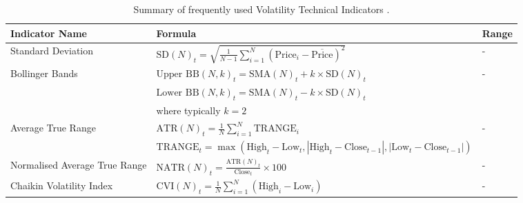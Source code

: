 \begin{table}[htb!]
\caption{Summary of frequently used Volatility Technical Indicators \cite{jansen_machine_2020}.}
\label{Tables:VolatilityIndicators}
\centering
\footnotesize
\begin{tabularx}{\textwidth}{@{}lXl@{}}
\toprule
\textbf{Indicator Name} & \textbf{Formula} & \textbf{Range} \\ 
\midrule
Standard Deviation & $\text{SD}(N)_t = \sqrt{\frac{1}{N-1} \sum_{i=1}^{N} (\text{Price}_i - \overline{\text{Price}})^2}$ & - \\
\addlinespace
Bollinger Bands & $\text{Upper BB}(N, k)_t = \text{SMA}(N)_t + k \times \text{SD}(N)_t$ & - \\
\addlinespace
& $\text{Lower BB}(N, k)_t = \text{SMA}(N)_t - k \times \text{SD}(N)_t$ & \\
\addlinespace
& where typically $ k = 2 $& \\
\addlinespace
Average True Range & $\text{ATR}(N)_t = \frac{1}{N} \sum_{i=1}^{N} \text{TRANGE}_i$ & - \\
\addlinespace
& $\text{TRANGE}_t = \max(\text{High}_t - \text{Low}_t, |\text{High}_t - \text{Close}_{t-1}|, |\text{Low}_t - \text{Close}_{t-1}|)$ & \\
\addlinespace
Normalised Average True Range & $\text{NATR}(N)_t = \frac{\text{ATR}(N)_t}{\text{Close}_t} \times 100$ & - \\
\addlinespace
Chaikin Volatility Index & $\text{CVI}(N)_t = \frac{1}{N} \sum_{i=1}^{N} (\text{High}_i - \text{Low}_i)$ & - \\
\bottomrule
\end{tabularx}
\end{table}
